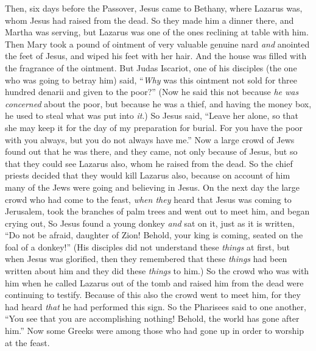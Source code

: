 \begin{biblechapter} %
 Then, six days before the Passover, Jesus came to Bethany, where Lazarus was, whom Jesus had raised from the dead.
\verse So they made him a dinner there, and Martha was serving, but Lazarus was one of the ones reclining at table with him.
\verse Then Mary took a pound of ointment of very valuable genuine nard \textit{and} anointed the feet of Jesus, and wiped his feet with her hair. And the house was filled with the fragrance of the ointment.
\verse But Judas Iscariot, one of his disciples (the one who was going to betray him) said,
\verse “\textit{Why} was this ointment not sold for three hundred denarii and given to the poor?”
\verse (Now he said this not because \textit{he was concerned} about the poor, but because he was a thief, and having the money box, he used to steal what was put into \textit{it}.)
\verse So Jesus said, “Leave her alone, so that she may keep it for the day of my preparation for burial.
\verse For you have the poor with you always, but you do not always have me.”
 Now a large crowd of Jews found out that he was there, and they came, not only because of Jesus, but so that they could see Lazarus also, whom he raised from the dead.
\verse So the chief priests decided that they would kill Lazarus also,
\verse because on account of him many of the Jews were going and believing in Jesus.
 On the next day the large crowd who had come to the feast, \textit{when they} heard that Jesus was coming to Jerusalem,
\verse took the branches of palm trees and went out to meet him, and began crying out,
\verse So Jesus found a young donkey \textit{and} sat on it, just as it is written,
\verse “Do not be afraid, daughter of Zion! 
Behold, your king is coming, 
seated on the foal of a donkey!”
\verse (His disciples did not understand these \textit{things} at first, but when Jesus was glorified, then they remembered that these \textit{things} had been written about him and they did these \textit{things} to him.)
\verse So the crowd who was with him when he called Lazarus out of the tomb and raised him from the dead were continuing to testify.
\verse Because of this also the crowd went to meet him, for they had heard \textit{that} he had performed this sign.
\verse So the Pharisees said to one another, “You see that you are accomplishing nothing! Behold, the world has gone after him.”
 Now some Greeks were among those who had gone up in order to worship at the feast.

\end{biblechapter}
